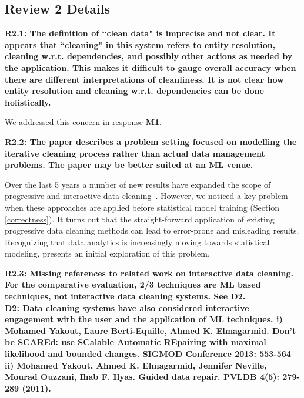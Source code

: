 \subsection*{Review 2 Details}

\noindent\textbf{R2.1: The definition of ``clean data" is imprecise and not clear. It appears that ``cleaning" in this system refers to entity resolution, cleaning w.r.t. dependencies, and possibly other actions as needed by the application. This makes it difficult to gauge overall accuracy when there are different interpretations of cleanliness. It is not clear how entity resolution and cleaning w.r.t. dependencies can be done holistically.}

We addressed this concern in response \textbf{M1}.

\vspace{0.5em}

\noindent\textbf{R2.2: The paper describes a problem setting focused on modelling the iterative cleaning process rather than actual data management problems. The paper may be better suited at an ML venue.}

Over the last 5 years a number of new results have expanded the scope of progressive and interactive data cleaning~\cite{mayfield2010eracer, DBLP:journals/pvldb/YakoutENOI11, yakout2013don, altowim2014progressive, whang2014incremental, papenbrock2015progressive, gruenheid2014incremental}.
However, we noticed a key problem when these approaches are applied before statistical model training (Section \ref{correctness}).
It turns out that the straight-forward application of existing progressive data cleaning methods
can lead to error-prone and misleading results.
Recognizing that data analytics is increasingly moving towards statistical modeling, \sys presents an initial exploration of this problem.  

\vspace{0.5em}

\noindent\textbf{R2.3: Missing references to related work on interactive data cleaning. For the comparative evaluation, 2/3 techniques are ML based techniques, not interactive data cleaning systems. See D2.\\
D2: Data cleaning systems have also considered interactive engagement with the user and the application of ML techniques. 
i) Mohamed Yakout, Laure Berti-Equille, Ahmed K. Elmagarmid. Don't be SCAREd: use SCalable Automatic REpairing with maximal likelihood and bounded changes. SIGMOD Conference 2013: 553-564
ii) Mohamed Yakout, Ahmed K. Elmagarmid, Jennifer Neville, Mourad Ouzzani, Ihab F. Ilyas.
Guided data repair. PVLDB 4(5): 279-289 (2011).
}


